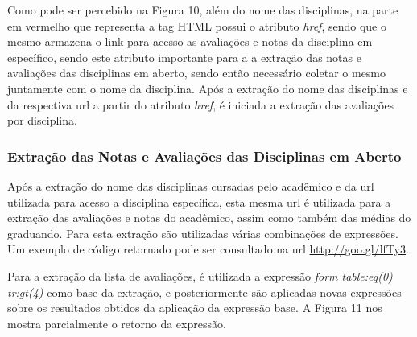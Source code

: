 Como pode ser percebido na Figura 10, além do nome das disciplinas, na parte em vermelho que representa a tag HTML possui o atributo \emph{href}, sendo que o mesmo armazena o link para acesso as avaliações e notas da disciplina em específico, sendo este atributo importante para a a extração das notas e avaliações das disciplinas em aberto, sendo então necessário coletar o mesmo juntamente com o nome da disciplina. Após a extração do nome das disciplinas e da respectiva url a partir do atributo \emph{href}, é iniciada a extração das avaliações por disciplina.

\subsubsection{Extração das Notas e Avaliações das Disciplinas em Aberto}
Após a extração do nome das disciplinas cursadas pelo acadêmico e da url utilizada para acesso a disciplina específica, esta mesma url é utilizada para a extração das avaliações e notas do acadêmico, assim como também das médias do graduando. Para esta extração são utilizadas várias combinações de expressões. Um exemplo de código retornado pode ser consultado na url \url{http://goo.gl/lfTy3}.

Para a extração da lista de avaliações, é utilizada a expressão \emph{form table:eq(0) tr:gt(4)} como base da extração, e posteriormente são aplicadas novas expressões sobre os resultados obtidos da aplicação da expressão base. A Figura 11 nos mostra parcialmente o retorno da expressão.

